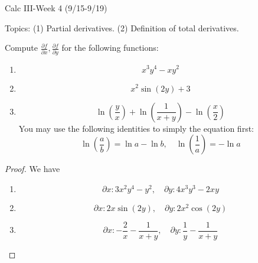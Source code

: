 \documentclass[openany]{book}
\begin{document}
\newpage

\begin{center}
    \Large Calc III-Week 4 (9/15-9/19)
\end{center}

\renewcommand\thesection{\arabic{section}}

\noindent
Topics: (1) Partial derivatives. (2) Definition of total derivatives.

\begin{prob}
    Compute $\frac{\partial f}{\partial x}, \frac{\partial f}{\partial y}$ for the following functions:
    \begin{enumerate}
        \item \begin{equation*}
            x^3y^4-xy^2
        \end{equation*}
        \item \begin{equation*}
            x^2\sin(2y)+3
        \end{equation*}
        \item \begin{equation*}
            \ln\left(\frac{y}{x}\right)+\ln\left(\frac{1}{x+y}\right)-\ln\left(\frac{x}{2}\right)
        \end{equation*}
        You may use the following identities to simply the equation first:
        \begin{equation*}
            \ln\left(\frac{a}{b}\right)=\ln a-\ln b, \quad \ln\left(\frac{1}{a}\right)=-\ln a
        \end{equation*}
    \end{enumerate}
\end{prob}
\begin{proof}
    We have 
    \begin{enumerate}
        \item \begin{equation*}
            \partial x: 3x^2y^4-y^2, \quad \partial y: 4x^3y^3-2xy
        \end{equation*}
        \item \begin{equation*}
            \partial x: 2x\sin(2y), \quad \partial y: 2x^2\cos(2y)
        \end{equation*}
        \item \begin{equation*}
            \partial x: -\frac{2}{x}-\frac{1}{x+y}, \quad \partial y: \frac{1}{y}-\frac{1}{x+y}
        \end{equation*}
    \end{enumerate}
\end{proof}
\end{document}
